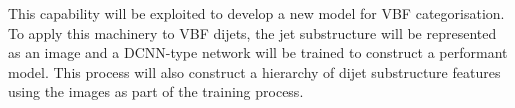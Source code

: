 This capability will be exploited to develop a new model for VBF categorisation.
To apply this machinery to VBF dijets, the jet substructure will be represented as an image and a DCNN-type network will be trained to construct a performant model. 
This process will also construct a hierarchy of dijet substructure features using the images as part of the training process. 









